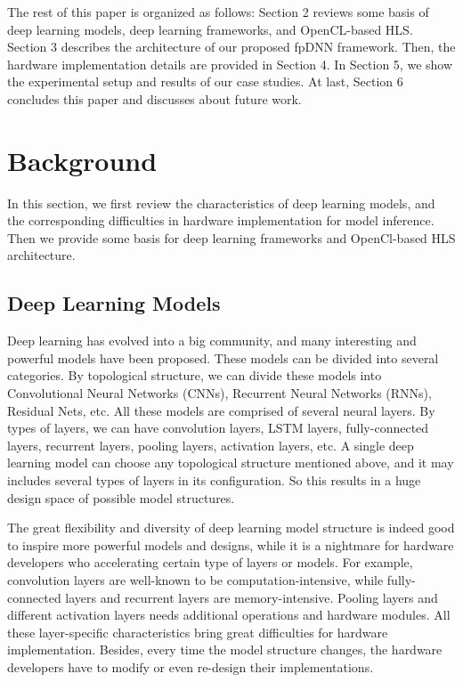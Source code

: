 \documentclass{acm_proc_article-sp-copy}
\begin{document}
The rest of this paper is organized as follows: Section 2 reviews some basis of deep learning models, deep learning frameworks, and OpenCL-based HLS. Section 3 describes the architecture of our proposed fpDNN framework. Then, the hardware implementation details are provided in Section 4. In Section 5, we show the experimental setup and results of our case studies. At last, Section 6 concludes this paper and discusses about future work.

\section{Background}
In this section, we first review the characteristics of deep learning models, and the corresponding difficulties in hardware implementation for model inference. Then we provide some basis for deep learning frameworks and OpenCl-based HLS architecture.

\subsection{Deep Learning Models}
Deep learning has evolved into a big community, and many interesting and powerful models have been proposed. These models can be divided into several categories. By topological structure, we can divide these models into Convolutional Neural Networks (CNNs), Recurrent Neural Networks (RNNs), Residual Nets, etc. All these models are comprised of several neural layers. By types of layers, we can have convolution layers, LSTM layers, fully-connected layers, recurrent layers, pooling layers, activation layers, etc. A single deep learning model can choose any topological structure mentioned above, and it may includes several types of layers in its configuration. So this results in a huge design space of possible model structures.

The great flexibility and diversity of deep learning model structure is indeed good to inspire more powerful models and designs, while it is a nightmare for hardware developers who accelerating certain type of layers or models. For example, convolution layers are well-known to be computation-intensive, while fully-connected layers and recurrent layers are memory-intensive. Pooling layers and different activation layers needs additional operations and hardware modules. All these layer-specific characteristics bring great difficulties for hardware implementation. Besides, every time the model structure changes, the hardware developers have to modify or even re-design their implementations.  
\end{document}
